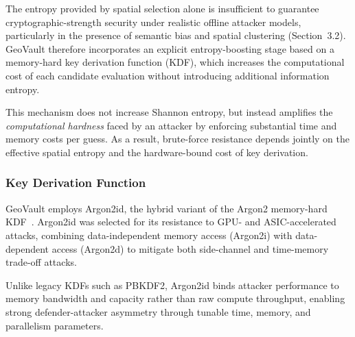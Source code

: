 \documentclass[journal,article,submit,pdftex,moreauthors]{Definitions/mdpi}
\begin{document}
The entropy provided by spatial selection alone is insufficient to guarantee cryptographic-strength security under realistic offline attacker models, particularly in the presence of semantic bias and spatial clustering (Section~3.2). GeoVault therefore incorporates an explicit entropy-boosting stage based on a memory-hard key derivation function (KDF), which increases the computational cost of each candidate evaluation without introducing additional information entropy.

This mechanism does not increase Shannon entropy, but instead amplifies the \emph{computational hardness} faced by an attacker by enforcing substantial time and memory costs per guess. As a result, brute-force resistance depends jointly on the effective spatial entropy and the hardware-bound cost of key derivation.

\subsubsection{Key Derivation Function}
\label{sec:argon2_parameters}

GeoVault employs Argon2id, the hybrid variant of the Argon2 memory-hard KDF~\cite{7467361}. Argon2id was selected for its resistance to GPU- and ASIC-accelerated attacks, combining data-independent memory access (Argon2i) with data-dependent access (Argon2d) to mitigate both side-channel and time-memory trade-off attacks.

Unlike legacy KDFs such as PBKDF2, Argon2id binds attacker performance to memory bandwidth and capacity rather than raw compute throughput, enabling strong defender-attacker asymmetry through tunable time, memory, and parallelism parameters.
\end{document}
